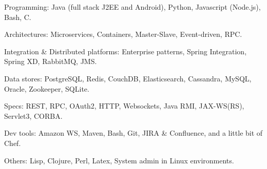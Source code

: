 \begin{rlist}
  \item Programming: Java (full stack J2EE and Android), Python, Javascript (Node.js),
  Bash, C.
  \item Architectures: Microservices, Containers, Master-Slave, Event-driven, RPC.
  \item Integration \& Distributed platforms: Enterprise patterns, Spring Integration, Spring XD, RabbitMQ, JMS.
  \item Data stores: PostgreSQL, Redis, CouchDB, Elasticsearch, Cassandra, MySQL, Oracle, Zookeeper, SQLite.
  \item Specs: REST, RPC, OAuth2, HTTP, Websockets, Java RMI, JAX-WS(RS), Servlet3, CORBA.
  \item Dev tools: Amazon WS, Maven, Bash, Git, JIRA \& Confluence, and a little bit of Chef.
  \item Others: Lisp, Clojure, Perl, Latex, System admin in Linux environments.
\end{rlist}

